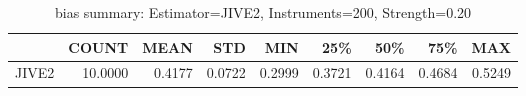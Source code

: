 \begin{table}[ht]
\centering
\caption{bias summary: Estimator=JIVE2, Instruments=200, Strength=0.20}
\begin{tabular}{lrrrrrrrr}
\toprule
 & COUNT & MEAN & STD & MIN & 25\% & 50\% & 75\% & MAX \\
\midrule
JIVE2 & 10.0000 & 0.4177 & 0.0722 & 0.2999 & 0.3721 & 0.4164 & 0.4684 & 0.5249 \\
\bottomrule
\end{tabular}
\end{table}
